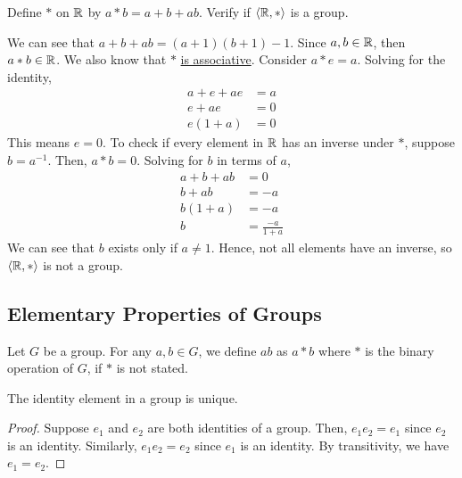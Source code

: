    \begin{example}
        Define \(*\) on \(\mathbb{R}\) by \(a * b = a + b + ab\). Verify if \(\langle \mathbb{R}, * \rangle\) is a group.

        We can see that \(a + b + ab = (a + 1)(b + 1) - 1\). Since \(a,b\in\mathbb{R}\), then \(a * b\in\mathbb{R}\). We also know that \(*\) \hyperref[exm:starAssoc]{is associative}. Consider \(a * e = a\). Solving for the identity,
        \begin{align*}
            a + e + ae &= a \\
            e + ae &= 0 \\
            e(1 + a) &= 0
        \end{align*}
        This means \(e = 0\). To check if every element in \(\mathbb{R}\) has an inverse under \(*\), suppose \(b = a^{-1}\). Then, \(a * b = 0\). Solving for \(b\) in terms of \(a\),
        \begin{align*}
            a + b + ab &= 0 \\
            b + ab &= -a \\
            b(1 + a) &= -a \\
            b &= \frac{-a}{1 + a}
        \end{align*}
        We can see that \(b\) exists only if \(a \neq 1\). Hence, not all elements have an inverse, so \(\langle \mathbb{R}, * \rangle\) is not a group. 
    \end{example}

    \subsection{Elementary Properties of Groups}

        \begin{note}
            Let \(G\) be a group. For any \(a, b\in G\), we define \(ab\) as \(a*b\) where \(*\) is the binary operation of \(G\), if \(*\) is not stated.
        \end{note}

        \begin{thm}
            The identity element in a group is unique.
        \end{thm}

        \begin{proof}
            Suppose \(e_1\) and \(e_2\) are both identities of a group. Then, \(e_1e_2 = e_1\) since \(e_2\) is an identity. Similarly, \(e_1e_2 = e_2\) since \(e_1\) is an identity. By transitivity, we have \(e_1 = e_2\).
        \end{proof}

